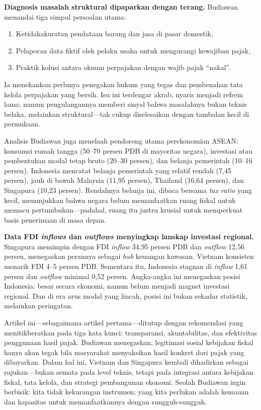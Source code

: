 \textbf{Diagnosis masalah struktural dipaparkan dengan terang.} Budiawan menandai tiga simpul persoalan utama:
\begin{enumerate}
    \item Ketidakakuratan pendataan barang dan jasa di pasar domestik,
    \item Pelaporan data fiktif oleh pelaku usaha untuk mengurangi kewajiban pajak, 
    \item Praktik kolusi antara oknum perpajakan dengan wajib pajak ``nakal''.
\end{enumerate}
Ia menekankan perlunya penegakan hukum yang tegas dan pembenahan tata kelola perpajakan yang bersih. Isu ini terdengar akrab, nyaris menjadi refrein lama; namun pengulangannya memberi sinyal bahwa masalahnya bukan teknis belaka, melainkan struktural---tak cukup diselesaikan dengan tambalan kecil di permukaan.

Analisis Budiawan juga menelaah pendorong utama perekonomian ASEAN: konsumsi rumah tangga (50--70 persen PDB di mayoritas negara), investasi atau pembentukan modal tetap bruto (20--30 persen), dan belanja pemerintah (10--16 persen). Indonesia mencatat belanja pemerintah yang relatif rendah (7{,}45 persen), jauh di bawah Malaysia (11{,}95 persen), Thailand (16{,}64 persen), dan Singapura (10{,}23 persen). Rendahnya belanja ini, dibaca bersama \textit{tax ratio} yang kecil, menunjukkan bahwa negara belum memanfaatkan ruang fiskal untuk memacu pertumbuhan---padahal, ruang itu justru krusial untuk memperkuat basis penerimaan di masa depan.

\textbf{Data FDI \textit{inflows} dan \textit{outflows} menyingkap lanskap investasi regional.} Singapura memimpin dengan FDI \textit{inflow} 34{,}95 persen PDB dan \textit{outflow} 12{,}56 persen, menegaskan perannya sebagai \textit{hub} keuangan kawasan. Vietnam konsisten menarik FDI 4--5 persen PDB. Sementara itu, Indonesia stagnan di \textit{inflow} 1{,}61 persen dan \textit{outflow} minimal 0{,}52 persen. Angka-angka ini menegaskan posisi Indonesia: besar secara ekonomi, namun belum menjadi magnet investasi regional. Dan di era arus modal yang lincah, posisi ini bukan sekadar statistik, melainkan peringatan.

Artikel ini---sebagaimana artikel pertama---ditutup dengan rekomendasi yang menitikberatkan pada tiga kata kunci: transparansi, akuntabilitas, dan efektivitas penggunaan hasil pajak. Budiawan menegaskan, legitimasi sosial kebijakan fiskal hanya akan tegak bila masyarakat menyaksikan hasil konkret dari pajak yang dibayarkan. Dalam hal ini, Vietnam dan Singapura kembali dihadirkan sebagai rujukan---bukan semata pada level teknis, tetapi pada integrasi antara kebijakan fiskal, tata kelola, dan strategi pembangunan ekonomi. Seolah Budiawan ingin berbisik: kita tidak kekurangan instrumen; yang kita perlukan adalah kemauan dan kapasitas untuk memanfaatkannya dengan sungguh-sungguh.
